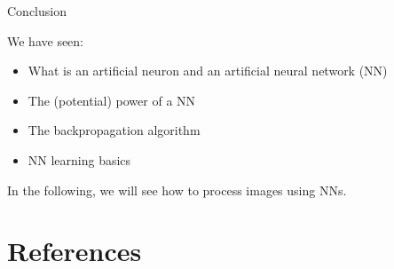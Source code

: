 \documentclass[xcolor=pdftex,dvipsnames,table,mathserif]{beamer}
\begin{document}


\begin{frame}{Conclusion}

  We have seen:
  \begin{itemize}
  \item What is an artificial neuron and an artificial neural network (NN)
  \item The (potential) power of a NN
  \item The backpropagation algorithm
  \item NN learning basics
  \end{itemize}

In the following, we will see how to process images using NNs.

\end{frame}


\section*{References}



\end{document}
